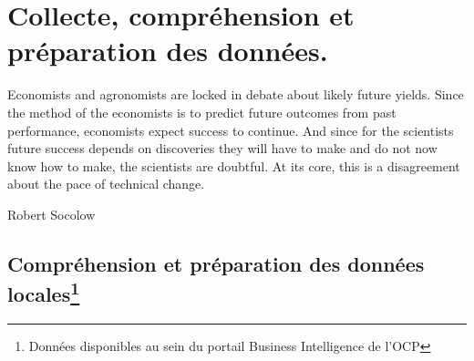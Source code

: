 \chapter{Collecte, compréhension et préparation des données.}
\epigraph{Economists and agronomists are locked in debate about likely
future yields. Since the method of the economists is to predict
future outcomes from past performance, economists expect
success to continue. And since for the scientists future success
depends on discoveries they will have to make and do not now
know how to make, the scientists are doubtful. At its core, this is
a disagreement about the pace of technical change.}{Robert
Socolow}	
\cleardoublepage
\newcommand{\reels}{\mathbb{R}}
	\section{Compréhension et préparation des données locales\protect\footnote{Données disponibles au sein du portail Business Intelligence de l'OCP}}
